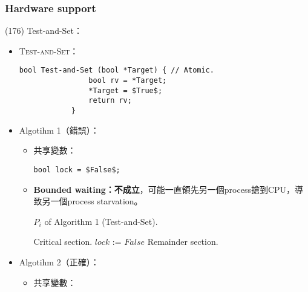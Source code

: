 \subsubsection{Hardware support}

\begin{theorem}{(176)} Test-and-Set：\begin{itemize}
        \item \textsc{Test-and-Set}：
        \begin{lstlisting}[caption={\textsc{Test-and-Set}.}, captionpos=b, mathescape=true]
            bool Test-and-Set (bool *Target) { // Atomic.
                bool rv = *Target;
                *Target = $True$;
                return rv;
            }
        \end{lstlisting}
        \item Algotihm 1（錯誤）：\begin{itemize}
            \item 共享變數：\begin{lstlisting}[caption={Shared variables of Algorithm 1 (\textsc{Test-and-Set}).}, captionpos=b, mathescape=true]
                bool lock = $False$; 
            \end{lstlisting}
            \item \textbf{Bounded waiting：不成立}，可能一直領先另一個process搶到CPU，導致另一個process starvation。
            \begin{algorithm}[H]
                \caption{$P_i$ of Algorithm 1 (Test-and-Set).}
                \label{algo:test-and-set-algo-1}
                \begin{algorithmic}[1]
                    \Repeat
                        \EndWhile
                        \State Critical section.
                        \State $lock$ := $False$
                        \State Remainder section.
                    \EndFunction
                \end{algorithmic}
            \end{algorithm}
        \end{itemize}
        \item Algotihm 2（正確）：\begin{itemize}
            \item 共享變數：\begin{lstlisting}[caption={Shared variables of Algorithm 2 (\textsc{Test-and-Set}).}, captionpos=b, mathescape=true]

\end{lstlisting}
\end{itemize}
\end{itemize}
\end{theorem}
